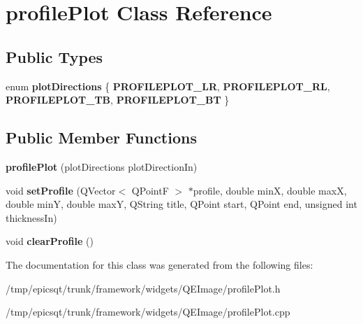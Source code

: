 \hypertarget{classprofilePlot}{
\section{profilePlot Class Reference}
\label{classprofilePlot}
}
\subsection*{Public Types}
\begin{DoxyCompactItemize}
\item 
enum {\bfseries plotDirections} \{ {\bfseries PROFILEPLOT\_\-LR}, 
{\bfseries PROFILEPLOT\_\-RL}, 
{\bfseries PROFILEPLOT\_\-TB}, 
{\bfseries PROFILEPLOT\_\-BT}
 \}
\end{DoxyCompactItemize}
\subsection*{Public Member Functions}
\begin{DoxyCompactItemize}
\item 
\hypertarget{classprofilePlot_a5c696503f6b37d5fe64550981c480c0f}{
{\bfseries profilePlot} (plotDirections plotDirectionIn)}
\label{classprofilePlot_a5c696503f6b37d5fe64550981c480c0f}

\item 
\hypertarget{classprofilePlot_ac0a918f1ee4c9a21345084d0d1bd765f}{
void {\bfseries setProfile} (QVector$<$ QPointF $>$ $\ast$profile, double minX, double maxX, double minY, double maxY, QString title, QPoint start, QPoint end, unsigned int thicknessIn)}
\label{classprofilePlot_ac0a918f1ee4c9a21345084d0d1bd765f}

\item 
\hypertarget{classprofilePlot_a618a94cd66bda1a72a8d5b6650ed6605}{
void {\bfseries clearProfile} ()}
\label{classprofilePlot_a618a94cd66bda1a72a8d5b6650ed6605}

\end{DoxyCompactItemize}


The documentation for this class was generated from the following files:\begin{DoxyCompactItemize}
\item 
/tmp/epicsqt/trunk/framework/widgets/QEImage/profilePlot.h\item 
/tmp/epicsqt/trunk/framework/widgets/QEImage/profilePlot.cpp\end{DoxyCompactItemize}

